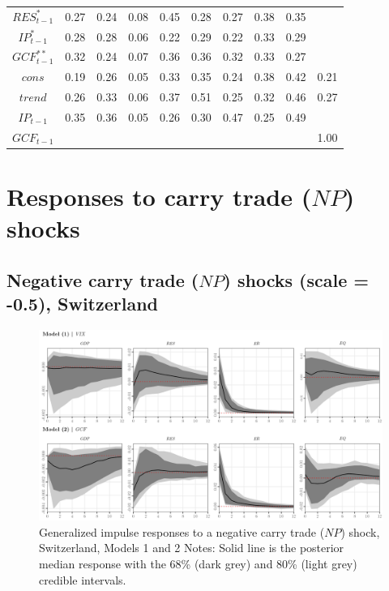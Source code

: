 \documentclass[a4paper, twoside]{templates/ociamthesis}
\begin{document}
\begin{table}[!ht]
\begin{tabular}[t]{cccccccccc}
$RES^*_{t-1}$ & 0.27 & 0.24 & 0.08 & 0.45 & 0.28 & 0.27 & 0.38 & 0.35 & \\
$IP^*_{t-1}$ & 0.28 & 0.28 & 0.06 & 0.22 & 0.29 & 0.22 & 0.33 & 0.29 & \\
$GCF^{**}_{t-1}$ & 0.32 & 0.24 & 0.07 & 0.36 & 0.36 & 0.32 & 0.33 & 0.27 & \\
$cons$ & 0.19 & 0.26 & 0.05 & 0.33 & 0.35 & 0.24 & 0.38 & 0.42 & 0.21\\
$trend$ & 0.26 & 0.33 & 0.06 & 0.37 & 0.51 & 0.25 & 0.32 & 0.46 & 0.27\\
$IP_{t-1}$ & 0.35 & 0.36 & 0.05 & 0.26 & 0.30 & 0.47 & 0.25 & 0.49 & \\
$GCF_{t-1}$ &  &  &  &  &  &  &  &  & 1.00\\
\bottomrule
\end{tabular}
\end{table}

\clearpage

\hypertarget{appendixdNP}{%
\section{\texorpdfstring{Responses to carry trade (\(NP\)) shocks}{Responses to carry trade (NP) shocks}}\label{appendixdNP}}

\hypertarget{appendixdNPCH}{%
\subsection{\texorpdfstring{Negative carry trade (\(NP\)) shocks (scale = -0.5), Switzerland}{Negative carry trade (NP) shocks (scale = -0.5), Switzerland}}\label{appendixdNPCH}}

\begin{figure}[!ht]

{\centering \includegraphics[width=0.99\columnwidth]{figure/g.MODEL12.NPLOWER.FUND.CH} 

}

\caption[Generalized impulse responses to a negative carry trade ($NP$) shock, Switzerland, Models 1 and 2]{Generalized impulse responses to a negative carry trade ($NP$) shock, Switzerland, Models 1 and 2 \newline \scriptsize Notes: Solid line is the posterior median response with the 68\% (dark grey) and 80\% (light grey) credible intervals.}\label{fig:Figure51}
\end{figure}
\end{document}

